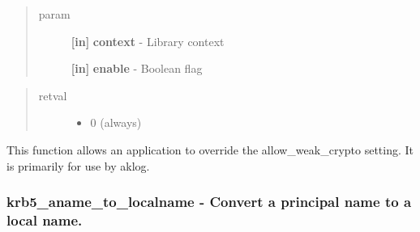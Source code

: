 \documentclass[letterpaper,10pt,english]{sphinxmanual}
\begin{document}
\begin{quote}\begin{description}
\item[{param}] \leavevmode
\textbf{{[}in{]}} \textbf{context} - Library context

\textbf{{[}in{]}} \textbf{enable} - Boolean flag

\end{description}\end{quote}
\begin{quote}\begin{description}
\item[{retval}] \leavevmode\begin{itemize}
\item {} 
0   (always)

\end{itemize}

\end{description}\end{quote}

This function allows an application to override the allow\_weak\_crypto setting. It is primarily for use by aklog.


\subsubsection{krb5\_aname\_to\_localname -  Convert a principal name to a local name.}
\label{appdev/refs/api/krb5_aname_to_localname::doc}\label{appdev/refs/api/krb5_aname_to_localname:krb5-aname-to-localname-convert-a-principal-name-to-a-local-name}

\begin{fulllineitems}
\label{appdev/refs/api/krb5_aname_to_localname:c.krb5_aname_to_localname}
\end{fulllineitems}
\end{document}
